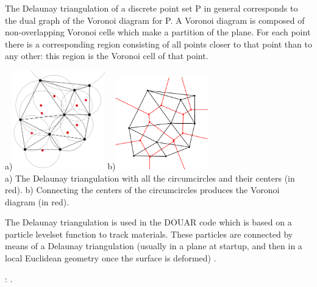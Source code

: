 The Delaunay triangulation of a discrete point set P in general corresponds 
to the dual graph of the Voronoi diagram for P. 
A Voronoi diagram is composed of non-overlapping Voronoi cells which make a partition 
of the plane. 
For each point there is a corresponding region consisting of all points closer to that 
point than to any other: this region is the Voronoi cell of that point.

\begin{center}
a)\includegraphics[width=4cm]{images/meshes/delaunay2}
b)\includegraphics[width=4cm]{images/meshes/voronoi}\\
{\captionfont a) The Delaunay triangulation with all the circumcircles and their centers (in red).
b) Connecting the centers of the circumcircles produces the Voronoi diagram (in red). }
\end{center}

The Delaunay triangulation is used in the DOUAR code which is based on a particle levelset function to track materials. These particles are connected by means of a Delaunay triangulation (usually in a plane at startup, and then in a local Euclidean geometry once the surface is deformed) \cite{brtf08}.

\Literature: \cite{gebo}.



